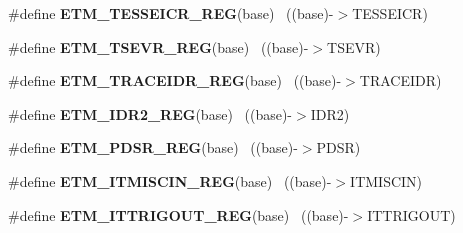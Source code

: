 \begin{DoxyCompactItemize}
\item 
\hypertarget{group___e_t_m___register___accessor___macros_gaf0391c4e8a812e4fa01ef2ca4d8f6df2}{}\#define {\bfseries E\+T\+M\+\_\+\+T\+E\+S\+S\+E\+I\+C\+R\+\_\+\+R\+E\+G}(base)                                  ~((base)-\/$>$T\+E\+S\+S\+E\+I\+C\+R)\label{group___e_t_m___register___accessor___macros_gaf0391c4e8a812e4fa01ef2ca4d8f6df2}

\item 
\hypertarget{group___e_t_m___register___accessor___macros_ga83a4269c1757f4cdd807bff720fe99cb}{}\#define {\bfseries E\+T\+M\+\_\+\+T\+S\+E\+V\+R\+\_\+\+R\+E\+G}(base)                                        ~((base)-\/$>$T\+S\+E\+V\+R)\label{group___e_t_m___register___accessor___macros_ga83a4269c1757f4cdd807bff720fe99cb}

\item 
\hypertarget{group___e_t_m___register___accessor___macros_ga328815399e3e1632d7ac26f69449b681}{}\#define {\bfseries E\+T\+M\+\_\+\+T\+R\+A\+C\+E\+I\+D\+R\+\_\+\+R\+E\+G}(base)                                  ~((base)-\/$>$T\+R\+A\+C\+E\+I\+D\+R)\label{group___e_t_m___register___accessor___macros_ga328815399e3e1632d7ac26f69449b681}

\item 
\hypertarget{group___e_t_m___register___accessor___macros_ga6dd8daad98207af1210c9638b561bebc}{}\#define {\bfseries E\+T\+M\+\_\+\+I\+D\+R2\+\_\+\+R\+E\+G}(base)                                          ~((base)-\/$>$I\+D\+R2)\label{group___e_t_m___register___accessor___macros_ga6dd8daad98207af1210c9638b561bebc}

\item 
\hypertarget{group___e_t_m___register___accessor___macros_ga58270e8c10a8ff4b9970b4536b16c1a0}{}\#define {\bfseries E\+T\+M\+\_\+\+P\+D\+S\+R\+\_\+\+R\+E\+G}(base)                                          ~((base)-\/$>$P\+D\+S\+R)\label{group___e_t_m___register___accessor___macros_ga58270e8c10a8ff4b9970b4536b16c1a0}

\item 
\hypertarget{group___e_t_m___register___accessor___macros_ga089d46eaa67ab4dad77c96c0c396f009}{}\#define {\bfseries E\+T\+M\+\_\+\+I\+T\+M\+I\+S\+C\+I\+N\+\_\+\+R\+E\+G}(base)                                  ~((base)-\/$>$I\+T\+M\+I\+S\+C\+I\+N)\label{group___e_t_m___register___accessor___macros_ga089d46eaa67ab4dad77c96c0c396f009}

\item 
\hypertarget{group___e_t_m___register___accessor___macros_ga36065849905919cb02e4ff0a695478e6}{}\#define {\bfseries E\+T\+M\+\_\+\+I\+T\+T\+R\+I\+G\+O\+U\+T\+\_\+\+R\+E\+G}(base)                                ~((base)-\/$>$I\+T\+T\+R\+I\+G\+O\+U\+T)\label{group___e_t_m___register___accessor___macros_ga36065849905919cb02e4ff0a695478e6}


\end{DoxyCompactItemize}
